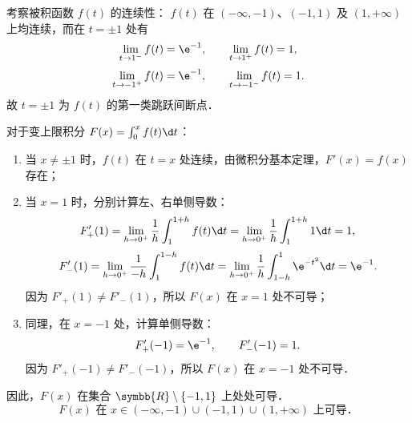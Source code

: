 \begin{solution}

    考察被积函数 $f(t)$ 的连续性：
    $f(t)$ 在 $(-\infty, -1)$、$(-1, 1)$ 及 $(1, +\infty)$ 上均连续，而在 $t = \pm 1$ 处有
    \begin{equation}
        \lim_{t\to 1^-} f(t) = \e^{-1}, \qquad \lim_{t\to 1^+} f(t) = 1,
    \end{equation}
    \begin{equation}
        \lim_{t\to -1^+} f(t) = \e^{-1}, \qquad \lim_{t\to -1^-} f(t) = 1.
    \end{equation}
    故 $t = \pm 1$ 为 $f(t)$ 的第一类跳跃间断点．

    对于变上限积分 $F(x) = \int_0^x f(t) \d t$：
    \begin{enumerate}
        \item 当 $x \neq \pm 1$ 时，$f(t)$ 在 $t = x$ 处连续，由微积分基本定理，$F'(x) = f(x)$ 存在；
        \item 当 $x = 1$ 时，分别计算左、右单侧导数：
              \begin{equation}
                  F'_+(1) = \lim_{h\to 0^+} \frac{1}{h}\int_1^{1+h} f(t)\d t = \lim_{h\to 0^+} \frac{1}{h}\int_1^{1+h} 1 \d t = 1,
              \end{equation}
              \begin{equation}
                  F'_-(1) = \lim_{h\to 0^+} \frac{1}{-h}\int_1^{1-h} f(t)\d t = \lim_{h\to 0^+} \frac{1}{h}\int_{1-h}^1 \e^{-t^2} \d t = \e^{-1}.
              \end{equation}
              因为 $F'_+(1) \neq F'_-(1)$，所以 $F(x)$ 在 $x = 1$ 处不可导；
        \item 同理，在 $x = -1$ 处，计算单侧导数：
              \begin{equation}
                  F'_+(-1) = \e^{-1}, \qquad F'_-(-1) = 1.
              \end{equation}
              因为 $F'_+(-1) \neq F'_-(-1)$，所以 $F(x)$ 在 $x = -1$ 处不可导．
    \end{enumerate}
    因此，$F(x)$ 在集合 $\symbb{R} \setminus \{-1, 1\}$ 上处处可导．
    \begin{equation}
        \boxed{F(x) \text{ 在 } x \in (-\infty, -1) \cup (-1, 1) \cup (1, +\infty) \text{ 上可导．}}
    \end{equation}



\end{solution}
